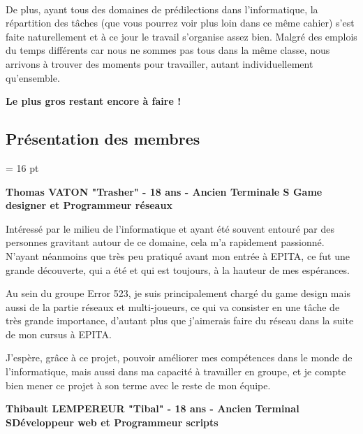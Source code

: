 \documentclass[12pt,a4paper]{article}
\begin{document}
\paragraph{}
De plus, ayant tous des domaines de prédilections dans l'informatique, la répartition des tâches (que vous pourrez voir plus loin dans ce même cahier) s'est faite naturellement et à ce jour le travail s'organise assez bien. Malgré des emplois du temps différents car nous ne sommes pas tous dans la même classe, nous arrivons à trouver des moments pour travailler, autant individuellement qu'ensemble.
\begin{center}
\textbf{Le plus gros restant encore à faire !}
\end{center}
\newpage
\subsection{Présentation des membres}
\baselineskip = 16 pt
\begin{center}
\textbf{Thomas VATON "Trasher" - 18 ans - Ancien Terminale S\newline
Game designer et Programmeur réseaux}
\end{center}

Intéressé par le milieu de l'informatique et ayant été souvent entouré par des personnes gravitant autour de ce domaine, cela m'a rapidement passionné. N'ayant néanmoins que très peu pratiqué avant mon entrée à EPITA, ce fut une grande découverte, qui a été et qui est toujours, à la hauteur de mes espérances.

Au sein du groupe Error 523, je suis principalement chargé du game design mais aussi de la partie réseaux et multi-joueurs, ce qui va consister en une tâche de très grande importance, d'autant plus que j'aimerais faire du réseau dans la suite de mon cursus à EPITA.
   
J'espère, grâce à ce projet, pouvoir améliorer mes compétences dans le monde de l'informatique, mais aussi dans ma capacité à travailler en groupe, et je compte bien mener ce projet à son terme avec le reste de mon équipe.

\begin{center}
\textbf{Thibault LEMPEREUR "Tibal" - 18 ans - Ancien Terminal S\newline Développeur web et Programmeur scripts}

\end{center}
\end{document}
